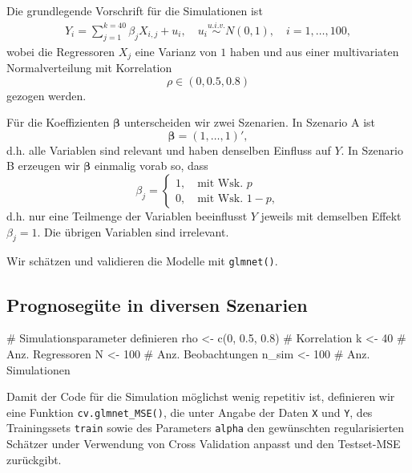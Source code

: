 \documentclass[
  a4paper,
  DIV=11,
  oneside]{scrreprt}
\newenvironment{Shaded}{\begin{snugshade}}{\end{snugshade}}
\newcommand{\CommentTok}[1]{\textcolor[rgb]{0.37,0.37,0.37}{#1}}
\newcommand{\DecValTok}[1]{\textcolor[rgb]{0.68,0.00,0.00}{#1}}
\newcommand{\FloatTok}[1]{\textcolor[rgb]{0.68,0.00,0.00}{#1}}
\newcommand{\FunctionTok}[1]{\textcolor[rgb]{0.28,0.35,0.67}{#1}}
\newcommand{\NormalTok}[1]{\textcolor[rgb]{0.00,0.23,0.31}{#1}}
\newcommand{\OtherTok}[1]{\textcolor[rgb]{0.00,0.23,0.31}{#1}}
\begin{document}
Die grundlegende Vorschrift für die Simulationen ist \begin{align*}
  Y_i = \sum_{j=1}^{k=40} \beta_j X_{i,j} + u_i, \quad u_i \overset{u.i.v.}{\sim} N(0,1), \quad i=1,\dots,100,
\end{align*} wobei die Regressoren \(X_j\) eine Varianz von \(1\) haben
und aus einer multivariaten Normalverteilung mit Korrelation
\[\rho\in(0,0.5,0.8)\] gezogen werden.

Für die Koeffizienten \(\boldsymbol{\beta}\) unterscheiden wir zwei
Szenarien. In Szenario A ist \[\boldsymbol{\beta} = (1,\dots,1)',\] d.h.
alle Variablen sind relevant und haben denselben Einfluss auf \(Y\). In
Szenario B erzeugen wir \(\boldsymbol{\beta}\) einmalig vorab so, dass
\[\beta_j = \begin{cases}1,\quad \text{mit Wsk.  }p\\ 0,\quad \text{mit Wsk.  }1-p, \end{cases}\]
d.h. nur eine Teilmenge der Variablen beeinflusst \(Y\) jeweils mit
demselben Effekt \(\beta_j = 1\). Die übrigen Variablen sind irrelevant.

Wir schätzen und validieren die Modelle mit \texttt{glmnet()}.

\hypertarget{sec-pdz}{%
\subsection{Prognosegüte in diversen Szenarien}\label{sec-pdz}}

\begin{Shaded}
\begin{Highlighting}[]
\CommentTok{\# Simulationsparameter definieren}
\NormalTok{rho }\OtherTok{\textless{}{-}} \FunctionTok{c}\NormalTok{(}\DecValTok{0}\NormalTok{, }\FloatTok{0.5}\NormalTok{, }\FloatTok{0.8}\NormalTok{)   }\CommentTok{\# Korrelation}
\NormalTok{k }\OtherTok{\textless{}{-}} \DecValTok{40}                 \CommentTok{\# Anz. Regressoren}
\NormalTok{N }\OtherTok{\textless{}{-}} \DecValTok{100}                \CommentTok{\# Anz. Beobachtungen}
\NormalTok{n\_sim }\OtherTok{\textless{}{-}} \DecValTok{100}            \CommentTok{\# Anz. Simulationen}
\end{Highlighting}
\end{Shaded}

Damit der Code für die Simulation möglichst wenig repetitiv ist,
definieren wir eine Funktion \texttt{cv.glmnet\_MSE()}, die unter Angabe
der Daten \texttt{X} und \texttt{Y}, des Trainingssets \texttt{train}
sowie des Parameters \texttt{alpha} den gewünschten regularisierten
Schätzer under Verwendung von Cross Validation anpasst und den
Testset-MSE zurückgibt.
\end{document}

